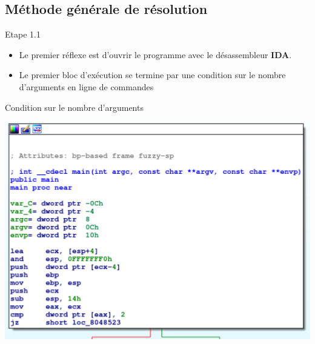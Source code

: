 \documentclass{beamer}
\begin{document}
	\subsection{Méthode générale de résolution}
	\begin{frame}
	\begin{block}{Etape 1.1}
		\begin{itemize}
			\item Le premier réflexe est d'ouvrir le programme avec le désassembleur \textbf{IDA}.
			\item Le premier bloc d'exécution se termine par une condition sur le nombre d'arguments en ligne de commandes
		\end{itemize}
	\end{block}
	\begin{exampleblock}{Condition sur le nombre d'arguments}
		\begin{center}
			\includegraphics[scale=0.4]{./pictures/114-reversing-3-1.PNG}
		\end{center}
	\end{exampleblock}
	\end{frame}
\end{document}
